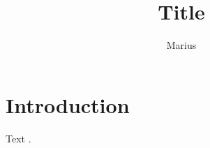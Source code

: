 \documentclass[11pt]{article}
\title{Title}
\author{Marius}
\begin{document}
\maketitle

\section{Introduction}
Text \cite{example}.

\printbibliography
\end{document}

